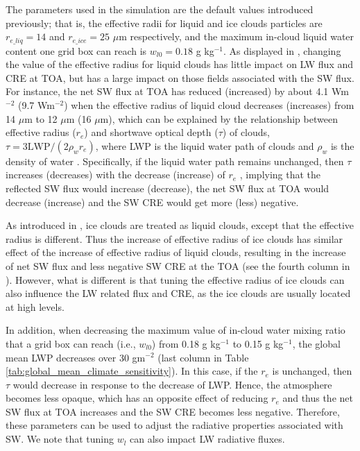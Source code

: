 The parameters used in the simulation are the default values introduced previously; that is, the effective radii for liquid and ice clouds particles are $r_{e\_liq}=14$ and $r_{e\_ice}=25$ $\mu$m respectively, and the maximum in-cloud liquid water content one grid box can reach is $w_{l0}=0.18$ g kg$^{-1}$. As displayed in , changing the value of the effective radius for liquid clouds has little impact on LW flux and CRE at TOA, but has a large impact on those fields associated with the SW flux. For instance, the net SW flux at TOA has reduced (increased) by about 4.1 Wm$^{-2}$ (9.7 Wm$^{-2}$) when the effective radius of liquid cloud decreases (increases) from 14 $\mu$m to 12 $\mu$m (16 $\mu$m), which can be explained by the relationship between effective radius ($r_e$) and shortwave optical depth ($\tau$) of clouds, $\tau= 3\text{LWP}/(2\rho_w r_e)$, where LWP is the liquid water path of clouds and $\rho_w$ is the density of water \citep{Morcrette1986}. Specifically, if the liquid water path remains unchanged, then $\tau$ increases (decreases) with the decrease (increase) of $r_e$ \citep[e.g.,][]{Slingo1982}, implying that the reflected SW flux would increase (decrease), the net SW flux at TOA would decrease (increase) and the SW CRE would get more (less) negative. 

As introduced in , ice clouds are treated as liquid clouds, except that the effective radius is different. Thus the increase of effective radius of ice clouds has similar effect of the increase of effective radius of liquid clouds, resulting in the increase of net SW flux and less negative SW CRE at the TOA (see the fourth column in ). However, what is different is that tuning the effective radius of ice clouds can also influence the LW related flux and CRE, as the ice clouds are usually located at high levels.

In addition, when decreasing the maximum value of in-cloud water mixing ratio that a grid box can reach (i.e., $w_{l0}$) from 0.18 g kg$^{-1}$ to 0.15 g kg$^{-1}$, the global mean LWP decreases over 30 gm$^{-2}$ (last column in Table \ref{tab:global_mean_climate_sensitivity}). In this case, if the $r_e$ is unchanged, then $\tau$ would decrease in response to the decrease of LWP. Hence, the atmosphere becomes less opaque, which has an opposite effect of reducing $r_e$ and thus the net SW flux at TOA increases and the SW CRE becomes less negative. Therefore, these parameters can be used to adjust the radiative properties associated with SW. We note that tuning $w_l$ can also impact LW radiative fluxes.

